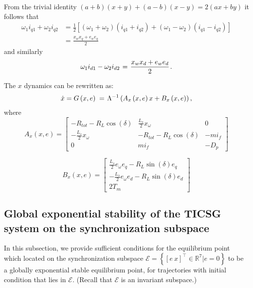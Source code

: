 \documentclass[letterpaper, 10 pt, conference]{ieeeconf}
\renewcommand{\o}    {{\omega}}
\newcommand{\half}   {{\frac{1}{2}}}
\newcommand{\m}      {{\hbox{\hskip 1pt}}}
\begin{document}
From the trivial identity $(a+b)(x+y)+(a-b)(x-y)=2(ax+by)$ it 
follows that
$$ \begin{aligned} \o_1 i_{q1}+\o_2 i_{q2} &= \half\left[(\o_1+\o_2)
   (i_{q1}+i_{q2})+(\o_1-\o_2)(i_{q1}-i_{q2})\right]\\ & =\frac{x_{w}
   x_{q}+e_{w}e_{q}}{2} \end{aligned} $$
and similarly \vspace{-3mm}
$$ \o_1 i_{d1}-\o_2 i_{d2} \m=\m \frac{x_{w}x_{d}+e_{w}e_d}{2} \m.$$

The $x$ dynamics can be rewritten as:
$$ \dot{x}=G \left( x,e\right) \m=\m \Lambda^{-1}\left(A_x \left(x,e 
   \right) x + B_x \left( x,e\right) \right),$$
where
$$
A_x \left(x,e \right)=\left[\begin{array}{ccc}
-R_{tot}-R_{L}\cos(\delta) & \frac{L_{s}}{2}x_{\omega} & 0\\
-\frac{L_{s}}{2}x_{\omega} & -R_{tot}-R_{L}\cos(\delta) & -mi_f\\
0 & mi_{f} & -D_{p}
\end{array}\right]
$$

$$
B_x \left(x,e \right)=\left[\begin{array}{c}
\frac{L_{s}}{2}e_{\omega}e_{q}-R_{L}\sin(\delta)e_{q}\\
-\frac{L_{s}}{2}e_{\omega}e_{d}-R_{L}\sin(\delta)e_{d}\\
2T_{m}
\end{array}\right]
$$

\subsection{Global exponential stability of the TICSG system on the
synchronization subspace }

In this subsection, we provide sufficient conditions for the
equilibrium point which located on the synchronization subspace
$\mathscr{E}=\left\{ \left[ e\ x \right]^\top\in\mathbb{R}^{7}|e=0
\right\}$ to be a globally exponential stable equilibrium point, for
trajectories with initial condition that lies in $\mathscr{E}$.
(Recall that $\mathscr{E}$ is an invariant subspace.)
\end{document}
